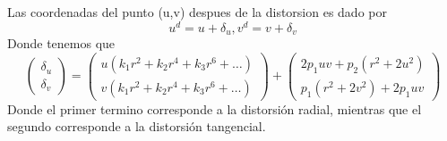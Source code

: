 Las coordenadas del punto (u,v) despues de la distorsion es dado por
\begin{equation}
	u^d = u + \delta_u, v^d = v+\delta_v
\end{equation}
Donde tenemos que
\begin{equation}
	\left(
	\begin{array}{c}
			\delta_u \\
			\delta_v
		\end{array}
	\right)
	=
	\left(
	\begin{array}{c}
			u(k_1r^2 + k_2r^4 + k_3r^6 + \dots) \\
			v(k_1r^2 + k_2r^4 + k_3r^6 + \dots)
		\end{array}
	\right)
	+
	\left(
	\begin{array}{c}
			2p_1uv + p_2(r^2+2u^2) \\
			p_1(r^2+2v^2) + 2p_1uv
		\end{array}
	\right)
\end{equation}
Donde el primer termino corresponde a la distorsión radial, mientras que el segundo corresponde a la distorsión tangencial.

